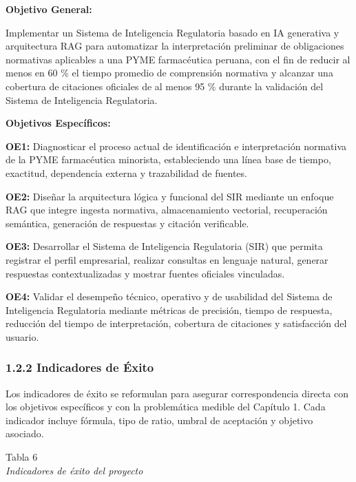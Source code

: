 \documentclass[12pt,a4paper,oneside]{report}
\begin{document}
\textbf{Objetivo General:}

Implementar un Sistema de Inteligencia Regulatoria basado en IA
generativa y arquitectura RAG para automatizar la interpretación
preliminar de obligaciones normativas aplicables a una PYME farmacéutica
peruana, con el fin de reducir al menos en 60 \% el tiempo promedio de
comprensión normativa y alcanzar una cobertura de citaciones oficiales
de al menos 95 \% durante la validación del Sistema de Inteligencia
Regulatoria.

\textbf{Objetivos Específicos:}

\textbf{OE1:} Diagnosticar el proceso actual de identificación e
interpretación normativa de la PYME farmacéutica minorista,
estableciendo una línea base de tiempo, exactitud, dependencia externa y
trazabilidad de fuentes.

\textbf{OE2:} Diseñar la arquitectura lógica y funcional del SIR
mediante un enfoque RAG que integre ingesta normativa, almacenamiento
vectorial, recuperación semántica, generación de respuestas y citación
verificable.

\textbf{OE3:} Desarrollar el Sistema de Inteligencia Regulatoria (SIR)
que permita registrar el perfil empresarial, realizar consultas en
lenguaje natural, generar respuestas contextualizadas y mostrar fuentes
oficiales vinculadas.

\textbf{OE4:} Validar el desempeño técnico, operativo y de usabilidad
del Sistema de Inteligencia Regulatoria mediante métricas de precisión,
tiempo de respuesta, reducción del tiempo de interpretación, cobertura
de citaciones y satisfacción del usuario.

\subsubsection{1.2.2 Indicadores de
Éxito}\label{indicadores-de-uxe9xito}

Los indicadores de éxito se reformulan para asegurar correspondencia
directa con los objetivos específicos y con la problemática medible del
Capítulo 1. Cada indicador incluye fórmula, tipo de ratio, umbral de
aceptación y objetivo asociado.

\label{_Toc231672261}{}Tabla 6\\
\emph{Indicadores de éxito del proyecto}
\end{document}
